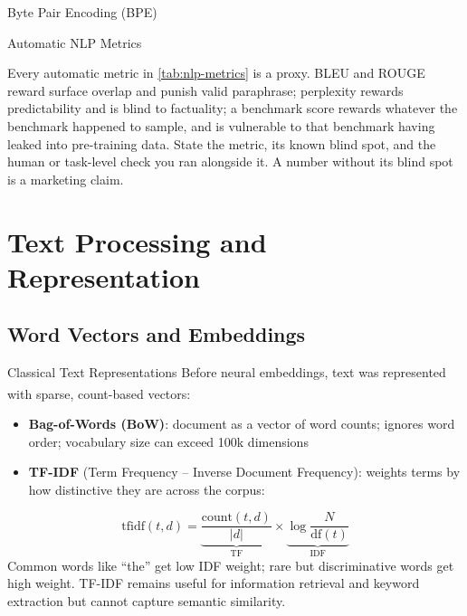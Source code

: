 \begin{v3topic}{Byte Pair Encoding (BPE)}
\begin{v3topic}{Automatic NLP Metrics}
\begin{cautionbox}
Every automatic metric in \cref{tab:nlp-metrics} is a proxy. BLEU and ROUGE
reward surface overlap and punish valid paraphrase; perplexity rewards
predictability and is blind to factuality; a benchmark score rewards whatever
the benchmark happened to sample, and is vulnerable to that benchmark having
leaked into pre-training data. State the metric, its known blind spot, and the
human or task-level check you ran alongside it. A number without its blind spot
is a marketing claim.
\end{cautionbox}
\end{v3topic}

\section{Text Processing and Representation}

\subsection{Word Vectors and Embeddings}

\begin{v3topic}{Classical Text Representations}
    Before neural embeddings, text was represented with sparse, count-based vectors\textsuperscript{\cite[][p.~34]{farrisHowLargeLanguage2025}}:
    \begin{itemize}
        \item \textbf{Bag-of-Words (BoW)}: document as a vector of word counts; ignores word order; vocabulary size can exceed 100k dimensions
        \item \textbf{TF-IDF} (Term Frequency -- Inverse Document Frequency): weights terms by how distinctive they are across the corpus:
    \end{itemize}
    \begin{equation}
        \mathrm{tfidf}(t, d) = \underbrace{\frac{\text{count}(t,d)}{|d|}}_{\text{TF}} \times \underbrace{\log\frac{N}{\text{df}(t)}}_{\text{IDF}}
    \end{equation}
    Common words like ``the'' get low IDF weight; rare but discriminative words get high weight.
    TF-IDF remains useful for information retrieval and keyword extraction but cannot capture semantic similarity.


\end{v3topic}
\end{v3topic}
